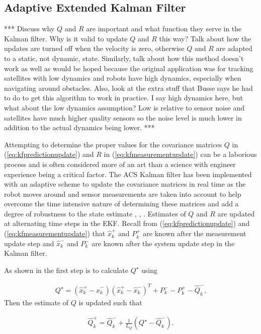 \subsection{Adaptive Extended Kalman Filter}
\label{sec:adaptiveekf}
*** Discuss why $Q$ and $R$ are important and what function they serve in the Kalman filter. Why is it valid to update $Q$ and $R$ this way? Talk about how the updates are turned off when the velocity is zero, otherwise $Q$ and $R$ are adapted to a static, not dynamic, state. Similarly, talk about how this method doesn't work as well as would be hoped because the original application was for tracking satellites with low dynamics and robots have high dynamics, especially when navigating around obstacles. Also, look at the extra stuff that Busse says he had to do to get this algorithm to work in practice. I say high dynamics here, but what about the low dynamics assumption? Low is relative to sensor noise and satellites have much higher quality sensors so the noise level is much lower in addition to the actual dynamics being lower. ***

Attempting to determine the proper values for the covariance matrices $Q$ in (\ref{eq:kfpredictionupdate}) and $R$ in (\ref{eq:kfmeasurementupdate}) can be a laborious process and is often considered more of an art than a science with engineer experience being a critical factor. The ACS Kalman filter has been implemented with an adaptive scheme to update the covariance matrices in real time as the robot moves around and sensor measurements are taken into account to help overcome the time intensive nature of determining these matrices and add a degree of robustness to the state estimate \cite{Sights06}, \cite{Mehra72}, \cite{Busse03adaptiveEKF}. Estimates of $Q$ and $R$ are updated at alternating time steps in the EKF. Recall from (\ref{eq:kfpredictionupdate}) and (\ref{eq:kfmeasurementupdate}) that $\hat{x}_k^+$ and $P_k^+$ are known after the measurement update step and $\hat{x}_k^-$ and $P_k^-$ are known after the system update step in the Kalman filter.

As shown in \cite{Busse03adaptiveEKF} the first step is to calculate $Q^\star$ using

\begin{align*}
Q^\star = \left(\hat{x}_k^+-\hat{x}_k^-\right)\left(\hat{x}_k^+-\hat{x}_k^-\right)^T + P_k^- - P_k^+ - \hat{Q}_k^-.
\end{align*}
Then the estimate of $Q$ is updated such that

\begin{align}
\label{eq:qadapt}
\hat{Q}_k^+ = \hat{Q}_k^- + \frac{1}{L_Q}\left(Q^\star-\hat{Q}_k^-\right).
\end{align}

